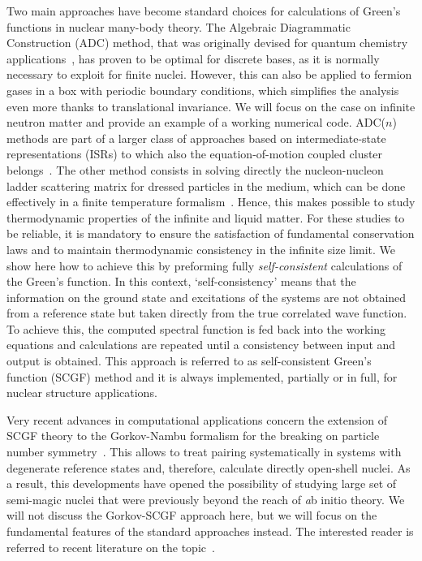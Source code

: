 Two main approaches have become standard choices for calculations of Green's functions in nuclear many-body theory.
%
The Algebraic Diagrammatic Construction (ADC) method, that was originally devised for quantum chemistry applications~\cite{ch11_Schirmer1982ADC2,ch11_Schirmer1983ADCn}, has proven to be optimal for discrete bases, as it is normally necessary to exploit for finite nuclei. However, this can also be applied to fermion gases in a box with periodic boundary conditions, which  simplifies the analysis even more thanks to translational invariance. We will focus on the case on infinite neutron matter and provide an example of a working numerical code.
%
ADC($n$) methods are part of a larger class of approaches based on intermediate-state representations (ISRs) to which also the equation-of-motion coupled cluster belongs~\cite{ch11_Mertins1996ISR1,ch11_Mertins1996ISR2}.
%
The other method consists in solving directly the nucleon-nucleon ladder scattering matrix for dressed particles in the medium, which can be done effectively in a finite temperature formalism~\cite{ch11_Frick2004PhD,ch11_Rios2007PhD}. Hence, this makes possible to study thermodynamic properties of the infinite and liquid matter. For these studies to be reliable, it is mandatory to ensure the satisfaction of fundamental conservation laws and to maintain thermodynamic consistency in the infinite size limit. We show here how to achieve this by preforming fully {\em self-consistent} calculations of the Green's function. In this context, `self-consistency' means that the information on the ground state and excitations of the systems are not obtained from a reference state but taken directly from the true correlated wave function. To achieve this, the computed spectral function is fed back into the working equations and calculations are repeated until a consistency between input and output is obtained.  This approach 
is referred to as self-consistent Green's function (SCGF) method and it is always implemented, partially or in full, for nuclear structure applications.

Very recent advances in computational applications concern the extension of SCGF theory to the Gorkov-Nambu formalism for the breaking on particle number symmetry~\cite{ch11_VdSluys1993,ch11_Soma2011GkvI,ch11_Idini2012}. This allows to  treat pairing systematically in systems with degenerate reference states and, therefore, calculate directly open-shell nuclei. As a result, this developments have  opened the possibility of  studying large set of semi-magic nuclei that were previously beyond the reach of {\emph ab initio} theory. We will not discuss the Gorkov-SCGF approach here, but we will focus on the fundamental features of the standard approaches instead. The interested reader is referred to recent literature on the topic~\cite{ch11_Soma2011GkvI,ch11_Soma2013rc,ch11_Soma2014Lanc,ch11_Cipollone2015OxChain}.

